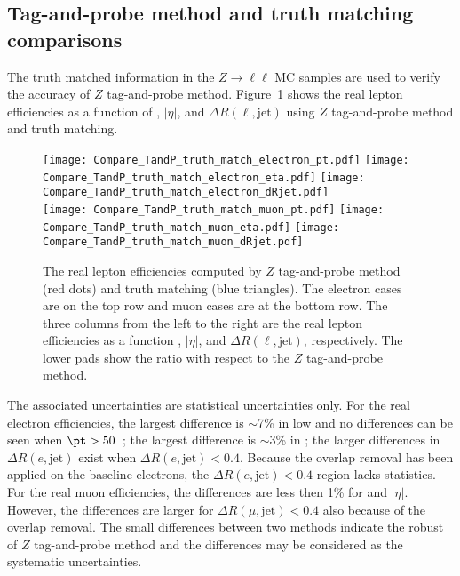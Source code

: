 \subsection{Tag-and-probe method and truth matching comparisons}
\label{subsec:app_RLE_truth_matched}
The truth matched information in the $Z \to \ell \ell$ MC samples are used to verify the accuracy of $Z$ tag-and-probe method.
Figure~\ref{fig:app_RLE_TandP_truth_match_comparisons} shows the real lepton efficiencies as a function of \pt, $|\eta|$, and $\Delta R(\ell, \mathrm{jet})$ using $Z$ tag-and-probe method and truth matching.
%
\begin{figure}[htb]
    \texttt{[image: Compare\_TandP\_truth\_match\_electron\_pt.pdf]}
    \texttt{[image: Compare\_TandP\_truth\_match\_electron\_eta.pdf]}
    \texttt{[image: Compare\_TandP\_truth\_match\_electron\_dRjet.pdf]}\\
    \texttt{[image: Compare\_TandP\_truth\_match\_muon\_pt.pdf]}
    \texttt{[image: Compare\_TandP\_truth\_match\_muon\_eta.pdf]}
    \texttt{[image: Compare\_TandP\_truth\_match\_muon\_dRjet.pdf]}
    \caption{The real lepton efficiencies computed by $Z$ tag-and-probe method (red dots) and truth matching (blue triangles).
    The electron cases are on the top row and muon cases are at the bottom row.
    The three columns from the left to the right are the real lepton efficiencies as a function \pt, $|\eta|$, and $\Delta R(\ell, \mathrm{jet})$, respectively.
    The lower pads show the ratio with respect to the $Z$ tag-and-probe method.}
    \label{fig:app_RLE_TandP_truth_match_comparisons}
\end{figure}
%
The associated uncertainties are statistical uncertainties only.
For the real electron efficiencies, the largest difference is $\sim$7\% in low \pt and no differences can be seen when $\pt > 50$~{\GeV}; the largest difference is $\sim$3\% in ; the larger differences in $\Delta R(e, \mathrm{jet})$ exist when $\Delta R(e, \mathrm{jet}) < 0.4$.
Because the overlap removal has been applied on the baseline electrons, the $\Delta R(e, \mathrm{jet}) < 0.4$ region lacks statistics.
For the real muon efficiencies, the differences are less then 1\% for \pt and $|\eta|$.
However, the differences are larger for $\Delta R(\mu, \mathrm{jet}) < 0.4$ also because of the overlap removal.
The small differences between two methods indicate the robust of $Z$ tag-and-probe method and the differences may be considered as the systematic uncertainties.

